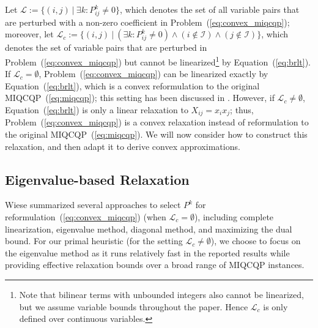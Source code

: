 \documentclass[]{article}
\begin{document}
Let $\mathcal{L}:=\{(i,j)\ |\ \exists k: P_{ij}^k\neq 0\}$, which denotes the set of all variable pairs that are perturbed with a non-zero coefficient in Problem~(\ref{eq:convex_miqcqp}); moreover, let $\mathcal{L}_c:=\{(i,j)\ |\ (\exists k: P_{ij}^k\neq 0) \wedge (i\not\in\mathcal{I}) \wedge (j\not\in\mathcal{I})\}$, which denotes the set of variable pairs that are perturbed in Problem~(\ref{eq:convex_miqcqp}) but cannot be linearized\footnote{Note that bilinear terms with unbounded integers also cannot be linearized, but we assume variable bounds throughout the paper. Hence $\mathcal{L}_c$ is only defined over continuous variables.} by Equation~(\ref{eq:brlt}).  If $\mathcal{L}_c = \emptyset$, Problem~(\ref{eq:convex_miqcqp}) can be linearized exactly by Equation~(\ref{eq:brlt}), which is a convex reformulation to the original MIQCQP~(\ref{eq:miqcqp}); this setting has been discussed in \cite{adams1986tight,billionnet2012extending,billionnet2016exact,wiese2021computational}. However, if $\mathcal{L}_c \neq \emptyset$, Equation~(\ref{eq:brlt}) is only a linear relaxation to $X_{ij} = x_ix_j$; thus, Problem~(\ref{eq:convex_miqcqp}) is a convex relaxation instead of reformulation to the original MIQCQP~(\ref{eq:miqcqp}). We will now consider how to construct this relaxation, and then adapt it to derive convex approximations.

\subsection{Eigenvalue-based Relaxation} \label{sec:org_eig_method}

Wiese \cite{wiese2021computational} summarized several approaches to select $P^k$ for reformulation~(\ref{eq:convex_miqcqp}) (when $\mathcal{L}_c = \emptyset$), including complete linearization, eigenvalue method, diagonal method, and maximizing the dual bound. For our primal heuristic (for the setting $\mathcal{L}_c \neq \emptyset$), we choose to focus on the eigenvalue method as it runs relatively fast in the reported results while providing effective relaxation bounds over a broad range of MIQCQP instances. 

\end{document}
